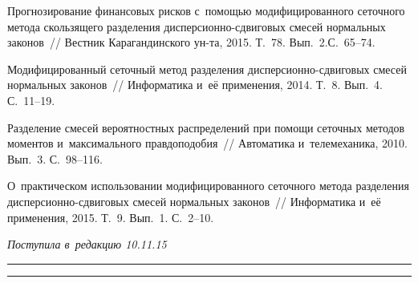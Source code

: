 \begin{multicols}{2}
{{\begin{thebibliography}{99}
 Прогнозирование финансовых
рисков с~по\-мощью модифицированного сеточного метода скользящего
разделения дис\-пер\-си\-он\-но-сдви\-го\-вых смесей нормальных законов~//
Вестник Карагандинского ун-та, 2015. Т.~78. Вып.~2.\linebreak С.~65--74.

  Модифицированный
сеточный метод разделения дис\-пер\-си\-он\-но-сдви\-го\-вых смесей нормальных
законов~// Информатика и~её применения, 2014. Т.~8. Вып.~4. С.~11--19.

  Разделение смесей
вероятностных распределений при помощи сеточных методов моментов 
и~максимального правдоподобия~// Автоматика и~телемеханика, 2010.
Вып.~3. С.~98--116.

  О~практическом
использовании модифицированного сеточного метода разделения
дис\-пер\-си\-он\-но-сдви\-го\-вых смесей нормальных законов~// Информатика и~её
применения, 2015. Т.~9. Вып.~1. С.~2--10.
 \end{thebibliography}

 }
 }

\end{multicols}

\vspace*{-3pt}

\hfill{\small\textit{Поступила в~редакцию 10.11.15}}

\vspace*{8pt}



\hrule

\vspace*{2pt}

\hrule

\vspace*{8pt}

\def\tit{MODELING OF~STATISTICAL REGULARITIES IN~FINANCIAL MARKETS
BY~GENERALIZED VARIANCE GAMMA DISTRIBUTIONS}

\def\titkol{Modeling of~statistical regularities in~financial markets
by~generalized variance gamma distributions}

\def\aut{V.\,Yu.~Korolev$^{1,2}$,  A.\,Yu.~Korchagin$^2$, and~I.\,A.~Sokolov$^3$}

\def\autkol{V.\,Yu.~Korolev,  A.\,Yu.~Korchagin, and~I.\,A.~Sokolov}

